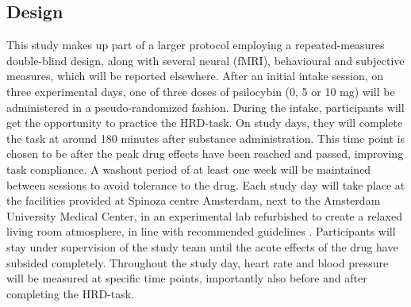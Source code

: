 \documentclass{article}
\begin{document}
\subsection{Design}
\begin{comment}
    • Your Methods section must include a description of experimental procedures in sufficient detail to allow another researcher to repeat the methodology exactly, without requiring further information other than that included in the protocol, your Supplementary Information file (if used) and, if applicable, the linked Code and Data (please refer to the Code Availability and Data availability statements below).
    • Provide full descriptions of any outcome-neutral criteria and positive controls. These quality checks might include the absence of floor or ceiling effects in data distributions, positive controls, or other quality checks that are orthogonal to the experimental hypotheses. 
    • You must have a statement on randomization in the Methods, if applicable.
    • For experimental studies, make it clear whether the design is within-subjects, between-subjects, mixed, or other.
    • You must have a statement indicating whether blinding will be used in the Methods, if applicable. If there will be no blinding, this must be clearly stated in the manuscript, as follows: "Data collection and analysis will not be performed blind to the conditions of the experiments.”
    • If your manuscript reports the results of a Phase 2 or 3 randomized controlled trial, you should also attach the CONSORT checklist with your submission.
\end{comment}


This study makes up part of a larger protocol employing a repeated-measures double-blind design, along with several neural (fMRI), behavioural and subjective measures, which will be reported elsewhere. After an initial intake session, on three experimental days, one of three doses of psilocybin (0, 5 or 10 mg) will be administered in a pseudo-randomized fashion. During the intake, participants will get the opportunity to practice the HRD-task. On study days, they will complete the task at around 180 minutes after substance administration. This time point is chosen to be after the peak drug effects have been reached and passed, improving task compliance. A washout period of at least one week will be maintained between sessions to avoid tolerance to the drug. Each study day will take place at the facilities provided at Spinoza centre Amsterdam, next to the Amsterdam University Medical Center, in an experimental lab refurbished to create a relaxed living room atmosphere, in line with recommended guidelines \parencite{johnson2008humanGuidelines}. Participants will stay under supervision of the study team until the acute effects of the drug have subsided completely. Throughout the study day, heart rate and blood pressure will be measured at specific time points, importantly also before and after completing the HRD-task.
\end{document}
